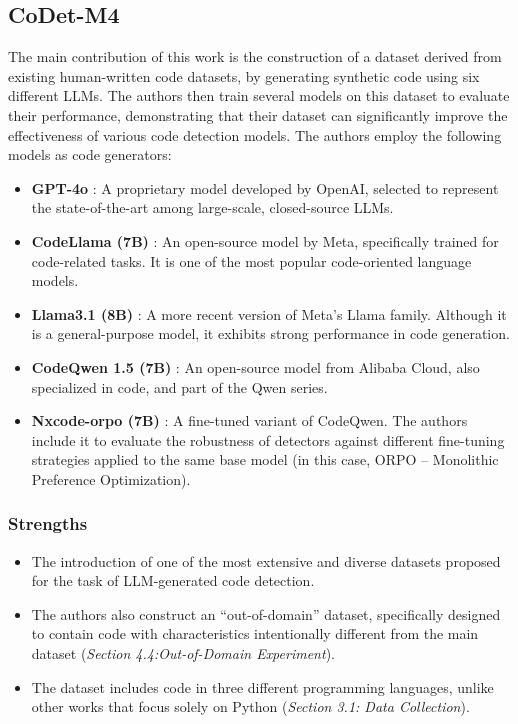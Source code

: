 \subsection{CoDet-M4}
\label{section:CoDet-M4}
The main contribution of this work is the construction 
of a dataset derived from existing human-written code datasets, 
by generating synthetic code using six different LLMs. 
The authors then train several models on this dataset 
to evaluate their performance, 
demonstrating that their dataset can significantly improve 
the effectiveness of various code detection models.
The authors employ the following models as code generators:

\begin{itemize}
    \item \textbf{GPT-4o} \cite{openai_gpt4o_2024} : A proprietary model developed by OpenAI, selected to represent the state-of-the-art among large-scale, closed-source LLMs.
    
    \item \textbf{CodeLlama (7B)} \cite{roziere2023code} : An open-source model by Meta, specifically trained for code-related tasks. It is one of the most popular code-oriented language models.
    
    \item \textbf{Llama3.1 (8B)} \cite{meta_llama3_1_2024} : A more recent version of Meta’s Llama family. Although it is a general-purpose model, it exhibits strong performance in code generation.
    
    \item \textbf{CodeQwen 1.5 (7B)} \cite{qwen_codeqwen1.5_blog_2024} : An open-source model from Alibaba Cloud, also specialized in code, and part of the Qwen series.
    
    \item \textbf{Nxcode-orpo (7B)} \cite{ntqa_nxcode_dataloop_2024} : A fine-tuned variant of CodeQwen. The authors include it to evaluate the robustness of detectors against different fine-tuning strategies applied to the same base model (in this case, ORPO – Monolithic Preference Optimization).
\end{itemize}


\subsubsection*{Strengths}
\begin{itemize}
    \item The introduction of one of the most extensive and diverse datasets proposed for the task of LLM-generated code detection.
    \item The authors also construct an ``out-of-domain'' dataset, specifically designed to contain code with characteristics intentionally different from the main dataset {(\scriptsize\textit{Section 4.4:Out-of-Domain Experiment})}.
    \item The dataset includes code in three different programming languages, unlike other works that focus solely on Python {(\scriptsize\textit{Section 3.1: Data Collection})}.
\end{itemize}

